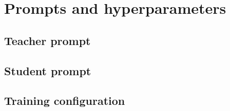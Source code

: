 \chapter{Prompts and hyperparameters}\label{app:prompts}

\section{Teacher prompt}

\section{Student prompt}

\section{Training configuration}
